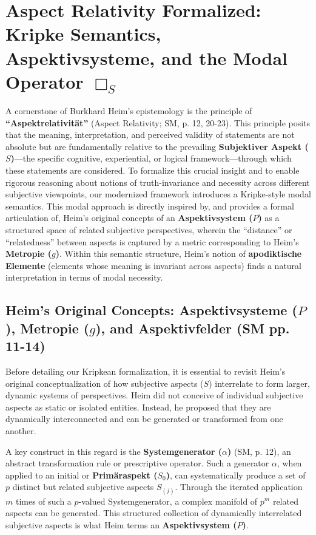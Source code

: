 \documentclass[
    12pt,              %
    a4paper,           %
    headings=normal,   %
    twoside=true,      %
    BCOR=8mm,          %
]{scrbook}
\newcommand{\q}[1]{\enquote{#1}}
\newcommand{\aspektivsystem}{P}
\newcommand{\subjektiveraspekt}{S}
\newcommand{\BoxS}{\Box_S}
\begin{document}
\section{Aspect Relativity Formalized: Kripke Semantics, Aspektivsysteme, and the Modal Operator \( \BoxS \)}
\label{sec:ch1_aspect_relativity_kripke} 

A cornerstone of Burkhard Heim’s epistemology is the principle of \textbf{\q{Aspektrelativität}} (Aspect Relativity; SM, p. 12, 20-23). This principle posits that the meaning, interpretation, and perceived validity of statements are not absolute but are fundamentally relative to the prevailing \textbf{Subjektiver Aspekt (\(\subjektiveraspekt\))}—the specific cognitive, experiential, or logical framework—through which these statements are considered. To formalize this crucial insight and to enable rigorous reasoning about notions of truth-invariance and necessity across different subjective viewpoints, our modernized framework introduces a Kripke-style modal semantics. This modal approach is directly inspired by, and provides a formal articulation of, Heim's original concepts of an \textbf{Aspektivsystem (\(\aspektivsystem\))} as a structured space of related subjective perspectives, wherein the \q{distance} or \q{relatedness} between aspects is captured by a metric corresponding to Heim’s \textbf{Metropie (\(g\))}. Within this semantic structure, Heim's notion of \textbf{apodiktische Elemente} (elements whose meaning is invariant across aspects) finds a natural interpretation in terms of modal necessity.

\subsection{Heim's Original Concepts: Aspektivsysteme (\(\aspektivsystem\)), Metropie (\(g\)), and Aspektivfelder (SM pp. 11-14)}
\label{sec:ch1_heim_aspektivsysteme} 

Before detailing our Kripkean formalization, it is essential to revisit Heim's original conceptualization of how subjective aspects (\(\subjektiveraspekt\)) interrelate to form larger, dynamic systems of perspectives. Heim did not conceive of individual subjective aspects as static or isolated entities. Instead, he proposed that they are dynamically interconnected and can be generated or transformed from one another.

A key construct in this regard is the \textbf{Systemgenerator (\(\alpha\))} (SM, p. 12), an abstract transformation rule or prescriptive operator. Such a generator \(\alpha\), when applied to an initial or \textbf{Primäraspekt (\(\subjektiveraspekt_0\))}, can systematically produce a set of \(p\) distinct but related subjective aspects \(S_{(j)}\). Through the iterated application \(m\) times of such a \(p\)-valued Systemgenerator, a complex manifold of \(p^m\) related aspects can be generated. This structured collection of dynamically interrelated subjective aspects is what Heim terms an \textbf{Aspektivsystem (\(\aspektivsystem\))}.
\end{document}
